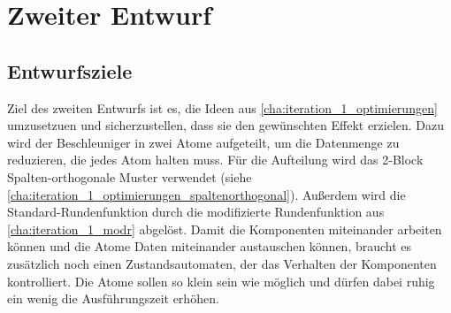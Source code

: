 \section{Zweiter Entwurf}
\subsection{Entwurfsziele}
Ziel des zweiten Entwurfs ist es, die Ideen aus \ref{cha:iteration_1_optimierungen} umzusetzuen und sicherzustellen, dass sie den gewünschten Effekt erzielen.
Dazu wird der Beschleuniger in zwei Atome aufgeteilt, um die Datenmenge zu reduzieren, die jedes Atom halten muss.
Für die Aufteilung wird das 2-Block Spalten-orthogonale Muster verwendet (siehe \ref{cha:iteration_1_optimierungen_spaltenorthogonal}).
Außerdem wird die Standard-Rundenfunktion durch die modifizierte Rundenfunktion aus \ref{cha:iteration_1_modr} abgelöst.
Damit die Komponenten miteinander arbeiten können und die Atome Daten miteinander austauschen können, braucht es zusätzlich noch
einen Zustandsautomaten, der das Verhalten der Komponenten kontrolliert.
Die Atome sollen so klein sein wie möglich und dürfen dabei ruhig ein wenig die Ausführungszeit erhöhen.

